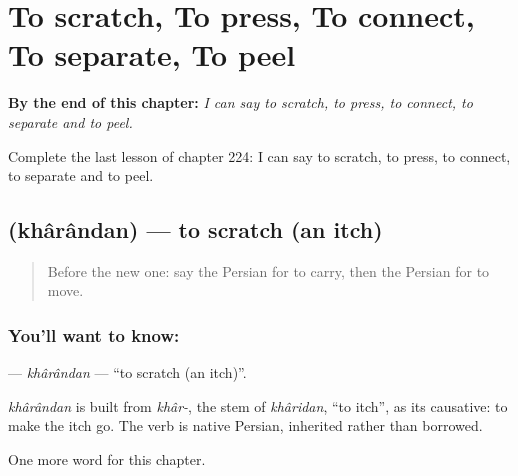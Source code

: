 
\chapter{To scratch, To press, To connect, To separate, To peel}
\label{ch:fa-to-scratch-to-press-to-connect-to-separate-to-peel}

\begin{chapteropening}
\textbf{By the end of this chapter:} \emph{I can say to scratch, to press, to connect, to separate and to peel.}

Complete the last lesson of chapter 224: I can say to scratch, to press, to connect, to separate and to peel.
\end{chapteropening}

\section[\texorpdfstring{\fa{خاراندن} (khârândan)}{خاراندن (khârândan)}]{ (khârândan) — to scratch (an itch)}

\label{lesson:FA-C224-kharandan}



\begin{quote}
Before the new one: say the Persian for to carry, then the Persian for to move.
\end{quote}

\subsection*{You'll want to know: }
\textbf{} — \emph{khârândan} — \textquotedblleft{}to scratch (an itch)\textquotedblright{}.

\begin{cousinweb}
\emph{khârândan} is built from \emph{khâr-}, the stem of \emph{khâridan}, \textquotedblleft{}to itch\textquotedblright{}, as its causative: to make the itch go. The verb is native Persian, inherited rather than borrowed.
\end{cousinweb}

\begin{grammarlens}[title={What you've built}]
One more word for this chapter.
\end{grammarlens}

